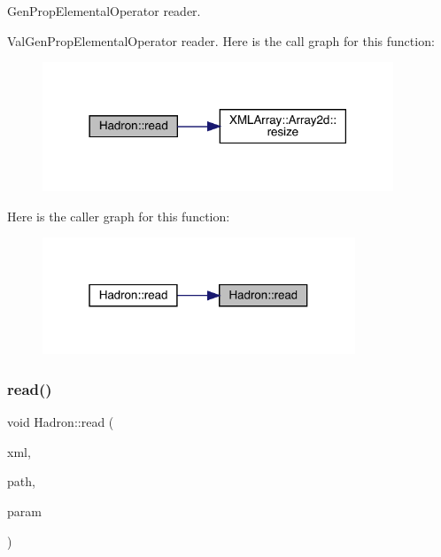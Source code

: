 Gen\+Prop\+Elemental\+Operator reader. 

Val\+Gen\+Prop\+Elemental\+Operator reader. Here is the call graph for this function\+:
\nopagebreak
\begin{figure}[H]
\begin{center}
\leavevmode
\includegraphics[width=297pt]{d1/daf/namespaceHadron_a26908582ef57fc950c0944a69dfcc275_cgraph}
\end{center}
\end{figure}
Here is the caller graph for this function\+:
\nopagebreak
\begin{figure}[H]
\begin{center}
\leavevmode
\includegraphics[width=265pt]{d1/daf/namespaceHadron_a26908582ef57fc950c0944a69dfcc275_icgraph}
\end{center}
\end{figure}
\mbox{\label{namespaceHadron_acbb0293cc9773c6009050757b471c4d8}} 
\subsubsection{\texorpdfstring{read()}{read()}\hspace{0.1cm}{\footnotesize\ttfamily [75/94]}}
{\footnotesize\ttfamily void Hadron\+::read (\begin{DoxyParamCaption}\item[{\mbox{\hyperlink{classADATXML_1_1XMLReader}{X\+M\+L\+Reader}} \&}]{xml,  }\item[{const std\+::string \&}]{path,  }\item[{\mbox{\hyperlink{structHadron_1_1KeyHadronNode__t}{Key\+Hadron\+Node\+\_\+t}} \&}]{param }\end{DoxyParamCaption})}



